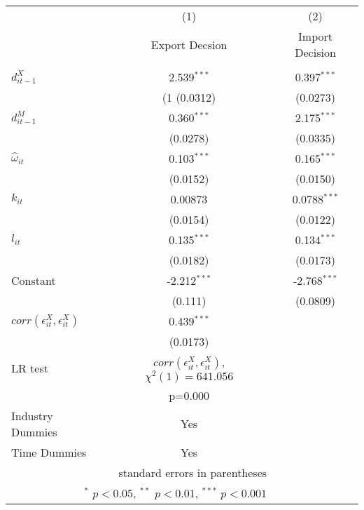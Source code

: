 \begin{center}
\begin{tabular}{l*{2}{c}}
\hline\hline
            &\multicolumn{1}{c}{(1)}&\multicolumn{1}{c}{(2)}\\
            &\multicolumn{1}{c}{Export
              Decsion}&\multicolumn{1}{c}{Import Decision}\\
\hline\\

$d_{it-1}^{X}$  &          2.539$^{***}$    &   0.397$^{***}$ \\
            &    (1    (0.0312)             &(0.0273)         \\
[1em]                                                        
$d_{it-1}^{M}$      &      0.360$^{***}$    &   2.175$^{***}$\\
            &          (0.0278)             &(0.0335)         \\
[1em]                                                        
$\hat{\omega}_{it}$  &     0.103$^{***}$     &  0.165$^{***}$\\
            &          (0.0152)             &(0.0150)         \\
[1em]                                                        
$k_{it}$       &        0.00873              & 0.0788$^{***}$\\
            &          (0.0154)             &(0.0122)         \\
[1em]                                                        
$l_{it}$     &            0.135$^{***}$     &  0.134$^{***}$\\
            &          (0.0182)             &(0.0173)         \\
[1em]                                                        
Constant      &          -2.212$^{***}$     & -2.768$^{***}$\\
            &           (0.111)             &(0.0809)         \\
\hline
$corr(\epsilon_{it}^{X},\epsilon_{it}^{X}) $      &       0.439$^{***}$\\
            &    (0.0173)         \\
LR test& $corr(\epsilon_{it}^{X},\epsilon_{it}^{X})$, $\chi^{2}(1)= 641.056$&\\
& p=0.000&\\
Industry Dummies & Yes& \\
Time Dummies& Yes& \\
\hline\hline
\multicolumn{2}{r}{\footnotesize  standard errors in parentheses}\\
\multicolumn{2}{r}{\footnotesize $^{*}$ \(p<0.05\), $^{**}$ \(p<0.01\), $^{***}$ \(p<0.001\)}\\
\end{tabular}
\end{center}
